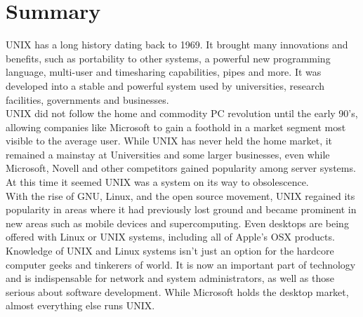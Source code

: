 \section*{Summary}

UNIX has a long history dating back to 1969.  It brought many innovations and benefits, such as portability to other systems, a powerful new programming language, multi-user and timesharing capabilities, pipes and more.  It was developed into a stable and powerful system used by universities, research facilities, governments and businesses.\\

UNIX did not follow the home and commodity PC revolution until the early 90's, allowing companies like Microsoft to gain a foothold in a market segment most visible to the average user.  While UNIX has never held the home market, it remained a mainstay at Universities and some larger businesses, even while Microsoft, Novell and other competitors gained popularity among server systems.  At this time it seemed UNIX was a system on its way to obsolescence.\\

With the rise of GNU, Linux, and the open source movement, UNIX regained its popularity in areas where it had previously lost ground and became prominent in new areas such as mobile devices and supercomputing.  Even desktops are being offered with Linux or UNIX systems, including all of Apple's OSX products.\\

Knowledge of UNIX and Linux systems isn't just an option for the hardcore computer geeks and tinkerers of world.  It is now an important part of technology and is indispensable for network and system administrators, as well as those serious about software development.  While Microsoft holds the desktop market, almost everything else runs UNIX.

